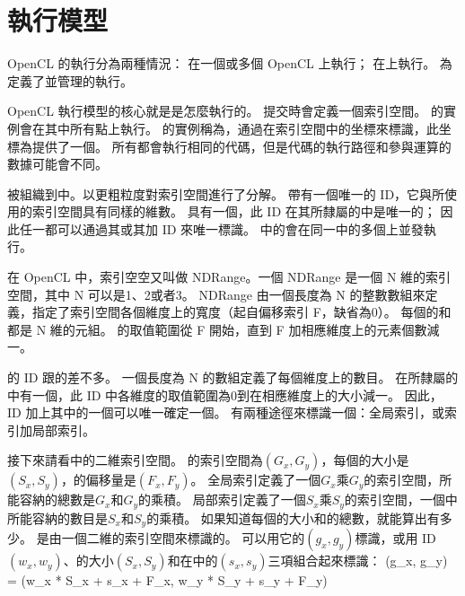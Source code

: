 
\section{執行模型}
OpenCL 的執行分為兩種情況：
在一個或多個 {\ftEmpha OpenCL} 上執行；
在上執行。
為定義了並管理的執行。

OpenCL 執行模型的核心就是是怎麼執行的。
提交時會定義一個索引空間。
的實例會在其中所有點上執行。
的實例稱為，通過在索引空間中的坐標來標識，此坐標為提供了一個。
所有都會執行相同的代碼，但是代碼的執行路徑和參與運算的數據可能會不同。

被組織到中。以更粗粒度對索引空間進行了分解。
帶有一個唯一的 ID，它與所使用的索引空間具有同樣的維數。
具有一個，此 ID 在其所隸屬的中是唯一的；
因此任一都可以通過其或其加 ID 來唯一標識。
中的會在同一中的多個上並發執行。

在 OpenCL 中，索引空空又叫做 NDRange。一個 NDRange 是一個 N 維的索引空間，其中 N 可以是1、2或者3。
NDRange 由一個長度為 N 的整數數組來定義，指定了索引空間各個維度上的寬度（起自偏移索引 F，缺省為0）。
每個的和都是 N 維的元組。
的取值範圍從 F 開始，直到 F 加相應維度上的元素個數減一。

的 ID 跟的差不多。
一個長度為 N 的數組定義了每個維度上的數目。
在所隸屬的中有一個，此 ID 中各維度的取值範圍為0到在相應維度上的大小減一。
因此， ID 加上其中的一個可以唯一確定一個。
有兩種途徑來標識一個：全局索引，或索引加局部索引。

接下來請看中的二維索引空間。
的索引空間為$(G_x, G_y)$，每個的大小是$(S_x, S_y)$，的偏移量是$(F_x, F_y)$。
全局索引定義了一個$G_x$乘$G_y$的索引空間，所能容納的總數是$G_x$和$G_y$的乘積。
局部索引定義了一個$S_x$乘$S_y$的索引空間，一個中所能容納的數目是$S_x$和$S_y$的乘積。
如果知道每個的大小和的總數，就能算出有多少。
是由一個二維的索引空間來標識的。
可以用它的$(g_x, g_y)$標識，或用 ID $(w_x, w_y)$、的大小$(S_x, S_y)$和在中的$(s_x, s_y)$三項組合起來標識：
\startformula
(g_x, g_y) = (w_x * S_x + s_x + F_x, w_y * S_y + s_y + F_y)
\stopformula

